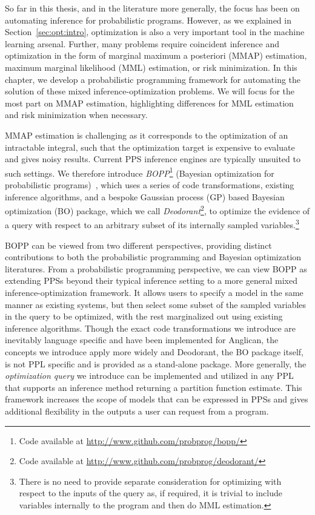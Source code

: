 
So far in this thesis, and in the literature more generally, the focus has been on automating
inference for probabilistic programs.  However, as we explained in Section~\ref{sec:opt:intro},
optimization is also a very important tool in the machine learning arsenal.  Further, many problems
require coincident inference and optimization in the form of marginal maximum a posteriori (MMAP) estimation,
maximum marginal likelihood (MML) estimation, or risk minimization.  In this chapter, we develop a probabilistic programming framework
for automating the solution of these mixed inference-optimization problems.
We will focus for the most part on
MMAP estimation, highlighting differences for MML estimation and risk minimization when necessary.

MMAP estimation is challenging as it corresponds to the optimization of an intractable integral, such that the 
optimization target is expensive to evaluate and gives noisy results.  Current PPS inference engines are 
typically unsuited to such settings.  We therefore introduce \emph{BOPP}\footnote{Code available at \url{http://www.github.com/probprog/bopp/}}
(Bayesian optimization for probabilistic programs)~\citep{rainforth2015workshopbopp,rainforth2016bayesian}, 
which uses a series of code transformations, existing inference algorithms,
and a bespoke Gaussian process (GP) based Bayesian optimization (BO) package, which we call \emph{Deodorant}\footnote{Code available
at \url{http://www.github.com/probprog/deodorant/}}, to optimize the evidence of a query with respect to
an arbitrary subset of its internally sampled variables.\footnote{There is no need to
	provide separate consideration for optimizing with respect to the inputs of the query as, if required,
	it is trivial to include variables internally to the program and then do MML estimation.}

BOPP can be viewed from two different perspectives, providing distinct contributions to both the probabilistic
programming and Bayesian optimization literatures.  From a probabilistic programming perspective, we can
view BOPP as extending PPSs beyond their typical inference setting to a more
general mixed inference-optimization framework.  It allows users to specify a model in the same manner 
as existing systems, but then select some subset of the sampled variables in the query to be optimized, 
with the rest marginalized out using existing inference algorithms.  Though the exact code transformations we
introduce are inevitably language specific and have been implemented for Anglican, the concepts we
introduce apply more widely and Deodorant, the BO package itself, is not PPL specific and is provided
as a stand-alone package.  More generally, the \textit{optimization query} we 
introduce can be implemented and utilized in any PPL that supports an inference method returning a 
partition function estimate.  This framework increases the scope of models that can be expressed in
PPSs and gives additional flexibility in the outputs a user can request from a program.

